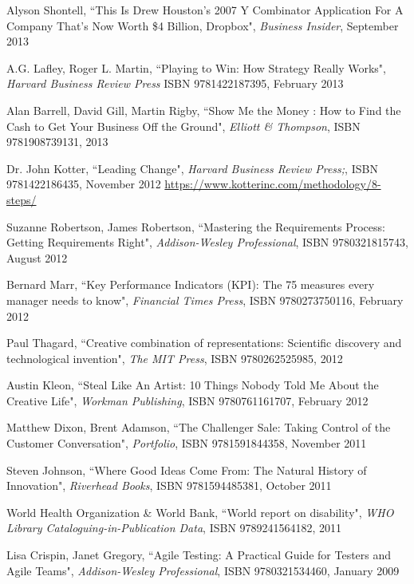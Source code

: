 \begin{thebibliography}{100}
 Alyson Shontell, ``This Is Drew Houston's 2007 Y Combinator Application For A Company 
That's Now Worth \$4 Billion, Dropbox", \emph{Business Insider}, September 2013

 A.G. Lafley, Roger L. Martin, ``Playing to Win: How Strategy Really Works", 
\emph{Harvard Business Review Press} ISBN 9781422187395, February 2013 

 Alan Barrell, David Gill, Martin Rigby, ``Show Me the Money : How to Find the Cash to Get Your 
Business Off the Ground", \emph{Elliott \& Thompson}, ISBN 9781908739131, 2013

 Dr. John Kotter, ``Leading Change", \emph{Harvard Business Review Press;}, 
ISBN 9781422186435, November 2012
\href{https://www.kotterinc.com/methodology/8-steps/}{https://www.kotterinc.com/methodology/8-steps/}

 Suzanne Robertson, James Robertson, ``Mastering the Requirements Process: Getting Requirements 
Right", \emph{Addison-Wesley Professional}, ISBN 9780321815743, August 2012

 Bernard Marr, ``Key Performance Indicators (KPI): The 75 measures every manager needs to know",
\emph{Financial Times Press}, ISBN 9780273750116, February 2012

 Paul Thagard, ``Creative combination of representations: Scientific discovery and 
technological invention", \emph{The MIT Press}, ISBN 9780262525985, 2012

 Austin Kleon, ``Steal Like An Artist: 10 Things Nobody Told Me About the Creative Life", 
\emph{Workman Publishing}, ISBN 9780761161707, February 2012

 Matthew Dixon, Brent Adamson, ``The Challenger Sale: Taking Control of the Customer 
Conversation", \emph{Portfolio}, ISBN 9781591844358, November 2011 

 Steven Johnson, ``Where Good Ideas Come From: The Natural History of Innovation",
\emph{Riverhead Books}, ISBN 9781594485381, October 2011

 World Health Organization \& World Bank, ``World report on disability",
\emph{WHO Library Cataloguing-in-Publication Data}, ISBN 9789241564182, 2011

 Lisa Crispin, Janet Gregory, ``Agile Testing: A Practical Guide for Testers and Agile 
Teams", \emph{Addison-Wesley Professional}, ISBN 9780321534460, January 2009


\end{thebibliography}
